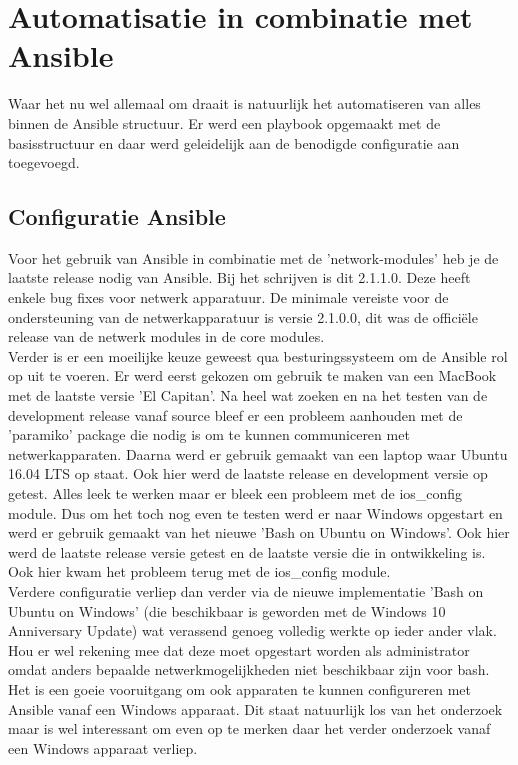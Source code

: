 
\chapter{Automatisatie in combinatie met Ansible}
\label{ch:ansible}
Waar het nu wel allemaal om draait is natuurlijk het automatiseren van alles binnen de Ansible structuur. Er werd een playbook opgemaakt met de basisstructuur en daar werd geleidelijk aan de benodigde configuratie aan toegevoegd.

\section{Configuratie Ansible}
\label{ch:ansibleconfiguratie}
Voor het gebruik van Ansible in combinatie met de 'network-modules' heb je de laatste release nodig van Ansible. Bij het schrijven is dit 2.1.1.0. Deze heeft enkele bug fixes voor netwerk apparatuur. De minimale vereiste voor de ondersteuning van  de netwerkapparatuur is versie 2.1.0.0, dit was de officiële release van de netwerk modules in de core modules. \autocite{ansiblechangelog}
\\

Verder is er een moeilijke keuze geweest qua besturingssysteem om de Ansible rol op uit te voeren. Er werd eerst gekozen om gebruik te maken van een MacBook met de laatste versie 'El Capitan'. Na heel wat zoeken en na het testen van de development release vanaf source bleef er een probleem aanhouden met de 'paramiko' package die nodig is om te kunnen communiceren met netwerkapparaten. Daarna werd er gebruik gemaakt van een laptop waar Ubuntu 16.04 LTS op staat. Ook hier werd de laatste release en development versie op getest. Alles leek te werken maar er bleek een probleem met de ios\_config module. Dus om het toch nog even te testen werd er naar Windows opgestart en werd er gebruik gemaakt van het nieuwe 'Bash on Ubuntu on Windows'. Ook hier werd de laatste release versie getest en de laatste versie die in ontwikkeling is. Ook hier kwam het probleem terug met de ios\_config module.
\\

Verdere configuratie verliep dan verder via de nieuwe implementatie 'Bash on Ubuntu on Windows' (die beschikbaar is geworden met de Windows 10 Anniversary Update) wat verassend genoeg volledig werkte op ieder ander vlak. Hou er wel rekening mee dat deze moet opgestart worden als administrator omdat anders bepaalde netwerkmogelijkheden niet beschikbaar zijn voor bash. Het is een goeie vooruitgang om ook apparaten te kunnen configureren met Ansible vanaf een Windows apparaat. Dit staat natuurlijk los van het onderzoek maar is wel interessant om even op te merken daar het verder onderzoek vanaf een Windows apparaat verliep. 
\\

